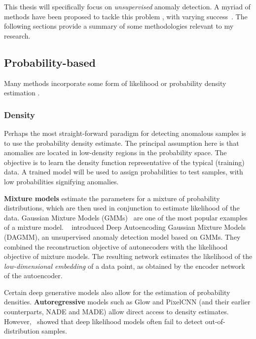 This thesis will specifically focus on \textit{unsupervised} anomaly detection. A myriad of methods have been proposed to tackle this problem \cite{pang_deep_2021,ruff_unifying_2021}, with varying success~\cite{han2022adbench}. The following sections provide a summary of some methodologies relevant to my research.

\subsection{Probability-based}

Many methods incorporate some form of likelihood or probability density estimation . 

\subsubsection*{Density}
Perhaps the most straight-forward paradigm for detecting anomalous samples is to use the probability density estimate. The principal assumption here is that anomalies are located in low-density regions in the probability space. The objective is to learn the density function representative of the typical (training) data. A trained model will be used to assign probabilities to test samples, with low probabilities signifying anomalies.


\textbf{Mixture models} estimate the parameters for a mixture of probability distributions, which are then used in conjunction to estimate likelihood of the data.
Gaussian Mixture Models (GMMs)~\cite{reynolds2009gaussian} are one of the most popular examples of a mixture model. ~\cite{zong2018deep} introduced Deep Autoencoding Gaussian Mixture Models (DAGMM), an unsupervised anomaly detection model based on GMMs. They combined the reconstruction objective of autonecoders with the likelihood objective of mixture models. The resulting network estimates the likelihood of the \textit{low-dimensional embedding} of a data point, as obtained by the encoder network of the autoencoder. 

Certain deep generative models also allow for the estimation of probability densities. \textbf{Autoregressive} models such as Glow and PixelCNN (and their earlier counterparts, NADE and MADE) allow direct access to density estimates. However,~\cite{nalisnick2018do} showed that deep likelihood models often fail to detect out-of-distribution samples.

